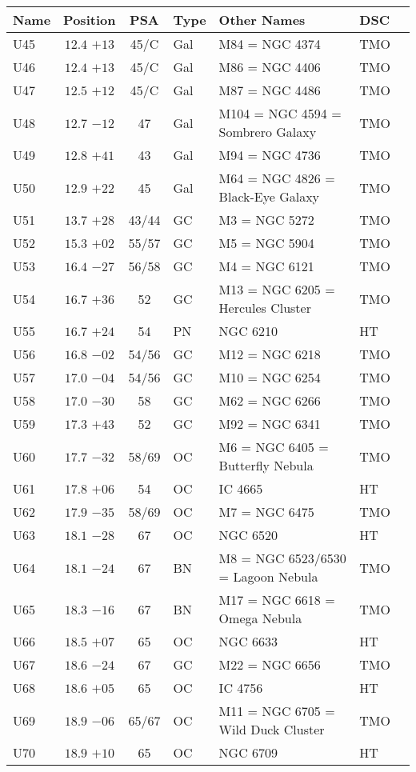 \begin{table}[p]
\setlength{\tabcolsep}{2pt}
\small
\begin{tabular}{lccllll}
\hline
Name&Position&PSA&Type&Other Names&DSC\\
\hline
U45 &$12.4$ $+13$&45/C&Gal&M84 = NGC 4374& TMO \\
U46 &$12.4$ $+13$&45/C&Gal&M86 = NGC 4406& TMO \\
U47 &$12.5$ $+12$&45/C&Gal&M87 = NGC 4486& TMO \\
U48 &$12.7$ $-12$&47&Gal&M104 = NGC 4594 = Sombrero Galaxy& TMO \\
U49 &$12.8$ $+41$&43&Gal&M94 = NGC 4736& TMO \\
U50 &$12.9$ $+22$&45&Gal&M64 = NGC 4826 = Black-Eye Galaxy& TMO \\
U51 &$13.7$ $+28$&43/44&GC &M3 = NGC 5272& TMO \\
U52 &$15.3$ $+02$&55/57&GC &M5 = NGC 5904& TMO \\
U53 &$16.4$ $-27$&56/58&GC &M4 = NGC 6121& TMO \\
U54 &$16.7$ $+36$&52&GC &M13 = NGC 6205 = Hercules Cluster& TMO \\
U55 &$16.7$ $+24$&54&PN &NGC 6210& HT  \\
U56 &$16.8$ $-02$&54/56&GC &M12 = NGC 6218& TMO \\
U57 &$17.0$ $-04$&54/56&GC &M10 = NGC 6254& TMO \\
U58 &$17.0$ $-30$&58&GC &M62 = NGC 6266& TMO \\
U59 &$17.3$ $+43$&52&GC &M92 = NGC 6341& TMO \\
U60 &$17.7$ $-32$&58/69&OC &M6 = NGC 6405 = Butterfly Nebula& TMO \\
U61 &$17.8$ $+06$&54&OC &IC 4665& HT  \\
U62 &$17.9$ $-35$&58/69&OC &M7 = NGC 6475& TMO \\
U63 &$18.1$ $-28$&67&OC &NGC 6520& HT  \\
U64 &$18.1$ $-24$&67&BN &M8 = NGC 6523/6530 = Lagoon Nebula& TMO \\
U65 &$18.3$ $-16$&67&BN &M17 = NGC 6618 = Omega Nebula& TMO \\
U66 &$18.5$ $+07$&65&OC &NGC 6633& HT  \\
U67 &$18.6$ $-24$&67&GC &M22 = NGC 6656& TMO \\
U68 &$18.6$ $+05$&65&OC &IC 4756& HT  \\
U69 &$18.9$ $-06$&65/67&OC &M11 = NGC 6705 = Wild Duck Cluster& TMO \\
U70 &$18.9$ $+10$&65&OC &NGC 6709& HT  \\

\end{tabular}
\end{table}
